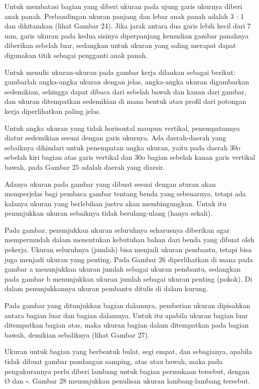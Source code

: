 \documentclass[11pt]{simart} %
\begin{document}
Untuk membatasi bagian yang diberi ukuran pada ujung garis ukurnya diberi anak panah. Perbandingan ukuran panjang dan lebar anak panah adalah 3 : 1 dan dihitamkan (lihat Gambar 24). Jika jarak antara dua garis lebih kecil dari 7 mm, garis ukuran pada kedua sisinya diperpanjang kemudian gambar panahnya diberikan sebelah luar, sedangkan untuk ukuran yang saling merapat dapat digunakan titik sebagai pengganti anak panah.

Untuk menulis ukuran-ukuran pada gambar kerja dilaukan sebagai berikut: gambarlah angka-angka ukuran dengan jelas, angka-angka ukuran digambarkan sedemikian, sehingga dapat dibaca dari sebelah bawah dan kanan dari gambar, dan ukuran ditempatkan sedemikian di mana bentuk atau profil dari potongan kerja diperlihatkan paling jelas.

Untuk angka ukuran yang tidak horisontal maupun vertikal, penempatannya diatur sedemikian sesuai dengan garis ukurnya. Ada daerah-daerah yang sebaiknya dihindari untuk penempatan angka ukuran, yaitu pada daerah 30o sebelah kiri bagian atas garis vertikal dan 30o bagian sebelah kanan garis vertikal bawah, pada Gambar 25 adalah daerah yang diarsir.

Adanya ukuran pada gambar yang dibuat sesuai dengan aturan akan memperjelas bagi pembaca gambar tentang benda yang sebenarnya, tetapi ada kalanya ukuran yang berlebihan justru akan membingungkan. Untuk itu penunjukkan ukuran sebaiknya tidak berulang-ulang (hanya sekali).

Pada gambar, penunjukkan ukuran seluruhnya seharusnya diberikan agar mempermudah dalam menentukan kebutuhan bahan dari benda yang dibuat oleh pekerja. Ukuran seluruhnya (jumlah) bisa menjadi ukuran pembantu, tetapi bisa juga menjadi ukuran yang penting. Pada Gambar 26 diperlihatkan di mana pada gambar a menunjukkan ukuran jumlah sebagai ukuran pembantu, sedangkan pada gambar b menunjukkan ukuran jumlah sebagai ukuran penting (pokok). Di dalam penunjukkannya ukuran pembantu ditulis di dalam kurung.

Pada gambar yang ditunjukkan bagian dalamnya, pemberian ukuran dipisahkan antara bagian luar dan bagian dalamnya. Untuk itu apabila ukuran bagian luar ditempatkan bagian atas, maka ukuran bagian dalam ditempatkan pada bagian bawah, demikian sebaliknya (lihat Gambar 27).

Ukuran untuk bagian yang berbentuk bulat, segi empat, dan sebagianya, apabila tidak dibuat gambar pandangan samping, atas atau bawah, maka pada pengukurannya perlu diberi lambang untuk bagian permukaan tersebut, dengan Ø dan $\square$. Gambar 28 menunjukkan penulisan ukuran lambang-lambang tersebut.
\end{document}
